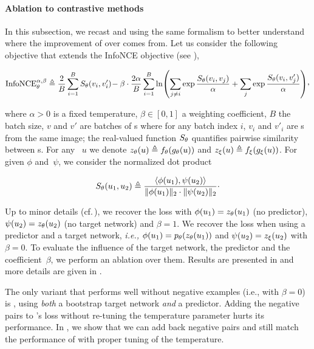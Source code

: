 \paragraph{Ablation to contrastive methods}
\label{subsec:simclr_to_pbl}
In this subsection, we recast \simclr and \algo using the same formalism to better understand  where the improvement of \algo over \simclr comes from. Let us consider the following objective that extends the InfoNCE objective \cite{CPC, poole2019variational} (see ),

\begin{align}
\text{InfoNCE}^{\alpha, \beta}_{\netparams} \eqdef
\label{eq:infonce}
 \frac{2}{B}\sum_{i=1}^B S_\netparams(v_i, v'_i)\!- \beta \cdot \frac{2\alpha}{B}\sum_{i=1}^B \ln\pa{\sum\limits_{j \neq i} \exp \frac{S_\netparams(v_i, v_j)}{\alpha} + \sum\limits_{j} \exp \frac{S_\netparams(v_i, v'_j)}{\alpha}}\CommaBin
\end{align}

where $\alpha>0$ is a fixed temperature, $\beta \in [0, 1]$ a weighting coefficient, $B$ the batch size, $v$ and $v'$ are batches of \augview s where for any batch index $i$, $v_i$ and $v'_i$ are \augview s from the same image; the real-valued function $S_{\theta}$ quantifies pairwise similarity between \augview s. For any \augview~$u$ we denote $z_{\theta}(u) \triangleq f_{\theta}(g_{\theta}(u))$ and $z_\xi(u) \triangleq f_\xi(g_\xi(u))$. For given $\phi$ and~$\psi$, we consider the normalized dot product

\begin{equation}
    S_{\theta}(u_1, u_2) \triangleq \frac{\langle \phi(u_1), \psi(u_2) \rangle }{\|\phi(u_1)\|_2\cdot \|\psi(u_2)\|_2}\cdot
\end{equation}

Up to minor details (cf.\,), we recover the \simclr loss with $\phi(u_1) = z_{\theta}(u_1)$ (no predictor), $\psi(u_2) = z_{\theta}(u_2)$ (no target network) and $\beta=1$. We recover the \algo loss when using a predictor and a target network, \emph{i.e.,} $\phi(u_1) = p_\netparams\pa{z_\netparams(u_1)}$ and $\psi(u_2) = z_\xi(u_2)$ with $\beta=0$. To evaluate the influence of the target network, the predictor and the coefficient~$\beta$, we perform an ablation over them. Results are presented in  and more details are given in .
 
The only variant that performs well without negative examples (i.e., with $\beta = 0$) is \algo, using \textit{both} a bootstrap target network \textit{and} a predictor. 
Adding the negative pairs to \algo's loss without re-tuning the temperature parameter hurts its performance. 
In , we show that we can add back negative pairs and still match the performance of \algo with proper tuning of the temperature.

